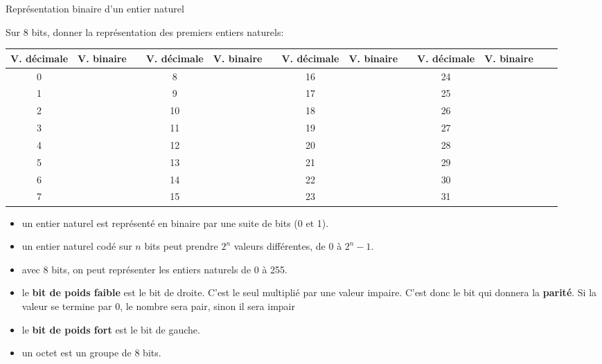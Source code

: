 	\begin{exercice_cours}{Représentation binaire d'un entier naturel}{}

		Sur 8 bits, donner la représentation des premiers entiers naturels:

\medskip

\begin{tabular}{|c|c|c|c|c|c|c|c|c|c|c|c|c|}
	\hline
	V. décimale & V. binaire & & V. décimale & V. binaire& & V. décimale & V. binaire& & V. décimale & V. binaire\\ \hline
	0 & & & 8 & & & 16 & & & 24 &\\ \hline
	1 & & & 9 & & & 17 & & & 25 &\\ \hline 
	2 & & & 10 & & & 18 & & & 26 &\\ \hline
	3 & & & 11 & & & 19 & & & 27 &\\ \hline
	4 & & & 12 & & & 20 & & & 28 &\\ \hline
	5 & & & 13 & & & 21 & & & 29 &\\ \hline
	6 & & & 14 & & & 22 & & & 30 &\\ \hline
	7 & & & 15 & & & 23 & & & 31 &\\ \hline
	


\end{tabular}

\end{exercice_cours}

\begin{propriete}[A retenir]{}

	\begin{itemize}
		\item un entier naturel est représenté en binaire par une suite de bits (0 et 1).
		\item un entier naturel codé sur $n$ bits peut prendre $2^n$ valeurs différentes, de 0 à $2^n-1$.
		\item avec 8 bits, on peut représenter les entiers naturels de 0 à 255.
		\item le \textbf{bit de poids faible} est le bit de droite. C'est le seul multiplié par une valeur impaire. C'est donc le bit qui donnera la \textbf{parité}. Si la valeur se termine par 0, le nombre sera pair, sinon il sera impair
		\item le \textbf{bit de poids fort} est le bit de gauche.
		\item un octet est un groupe de 8 bits.
	\end{itemize}

\end{propriete}


